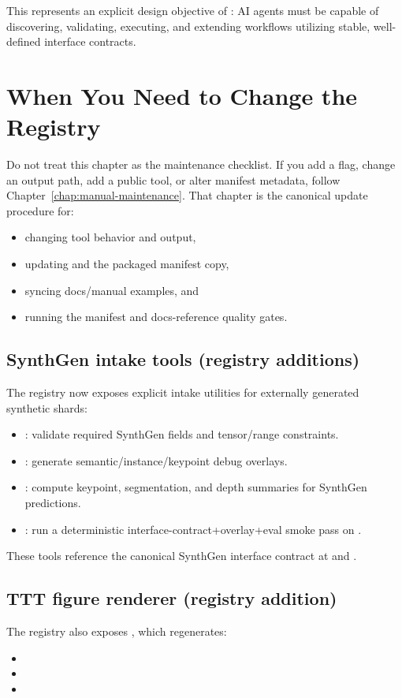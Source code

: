 This represents an explicit design objective of \yolozu{}: AI agents must be capable of discovering, validating, executing, and extending workflows utilizing stable, well-defined interface contracts.

\section{When You Need to Change the Registry}
Do not treat this chapter as the maintenance checklist. If you add a flag,
change an output path, add a public tool, or alter manifest metadata, follow
Chapter~\ref{chap:manual-maintenance}. That chapter is the canonical update procedure for:
\begin{itemize}
  \item changing tool behavior and  output,
  \item updating  and the packaged manifest copy,
  \item syncing docs/manual examples, and
  \item running the manifest and docs-reference quality gates.
\end{itemize}

\subsection*{SynthGen intake tools (registry additions)}
The registry now exposes explicit intake utilities for externally generated synthetic shards:
\begin{itemize}
  \item {}: validate required SynthGen fields and tensor/range constraints.
  \item {}: generate semantic/instance/keypoint debug overlays.
  \item {}: compute keypoint, segmentation, and depth summaries for SynthGen predictions.
  \item {}: run a deterministic interface-contract+overlay+eval smoke pass on .
\end{itemize}

These tools reference the canonical SynthGen interface contract at  and .

\subsection*{TTT figure renderer (registry addition)}
The registry also exposes , which regenerates:
\begin{itemize}
  \item {}
  \item {}
  \item {}
\end{itemize}

